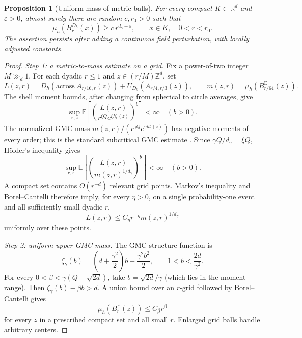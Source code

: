 \documentclass[11pt,reqno]{amsart}
\theoremstyle{plain}
\newtheorem{proposition}[theorem]{Proposition}
\theoremstyle{definition}
\theoremstyle{remark}
\newcommand{\R}{\mathbb R}
\newcommand{\E}{\mathbb E}
\newcommand{\1}{\mathbf{1}}
\newcommand{\Be}{B^{\mathrm E}}
\newcommand{\bh}{B^{D_h}}
\begin{document}
\begin{proposition}[Uniform mass of metric balls]\label{prop:volume}
For every compact $K\subset\R^d$ and $\varepsilon>0$, almost surely there are random $c,r_0>0$ such that
\begin{equation}\label{eq:volume}
\mu_h(\bh_r(x))\ge c\,r^{d_\gamma+\varepsilon},\qquad x\in K,\quad0<r<r_0.
\end{equation}
The assertion persists after adding a continuous field perturbation, with locally adjusted constants.
\end{proposition}
\begin{proof}
\emph{Step 1: a metric-to-mass estimate on a grid.} Fix a power-of-two integer $M\gg_d1$. For each dyadic $r\le1$ and $z\in(r/M)\mathbb Z^d$, set
\[
L(z,r)=D_h(\mathrm{across}\ A_{r/16,r}(z))
+U_{D_h}(A_{r/4,r/3}(z)),\qquad m(z,r)=\mu_h(\Be_{r/64}(z)).
\]
The shell moment bounds, after changing from spherical to circle averages, give
\[
\sup_{r,z}\E\left[\left(\frac{L(z,r)}{r^{\xi Q}e^{\xi h_r^\circ(z)}}\right)^b\right]<\infty\quad(b>0).
\]
The normalized GMC mass $m(z,r)/(r^{\gamma Q}e^{\gamma h_r^\circ(z)})$ has negative moments of every order; this is the standard subcritical GMC estimate \cite{RV}. Since $\gamma Q/d_\gamma=\xi Q$, H\"older's inequality gives
\begin{equation}\label{eq:Lmass}
\sup_{r,z}\E\left[\left(\frac{L(z,r)}{m(z,r)^{1/d_\gamma}}\right)^b\right]<\infty\quad(b>0).
\end{equation}
A compact set contains $O(r^{-d})$ relevant grid points. Markov's inequality and Borel--Cantelli therefore imply, for every $\eta>0$, on a single probability-one event and all sufficiently small dyadic $r$,
\begin{equation}\label{eq:Lgrid}
L(z,r)\le C_\eta r^{-\eta}m(z,r)^{1/d_\gamma}
\end{equation}
uniformly over these points.

\emph{Step 2: uniform upper GMC mass.} The GMC structure function is
\[
\zeta_\gamma(b)=\left(d+\frac{\gamma^2}{2}\right)b-\frac{\gamma^2b^2}{2},
\qquad 1<b<\frac{2d}{\gamma^2}.
\]
For every $0<\beta<\gamma(Q-\sqrt{2d})$, take $b=\sqrt{2d}/\gamma$ (which lies in the moment range). Then $\zeta_\gamma(b)-\beta b>d$. A union bound over an $r$-grid followed by Borel--Cantelli gives
\begin{equation}\label{eq:mass-upper}
\mu_h(\Be_r(z))\le C_\beta r^\beta
\end{equation}
for every $z$ in a prescribed compact set and all small $r$. Enlarged grid balls handle arbitrary centers.


\end{proof}
\end{document}
